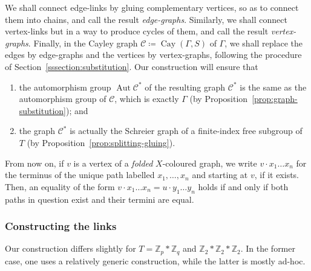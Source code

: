 \documentclass[ALCO,ThmDefs,Unicode,epreuves]{cedram}
\newcommand{\ZZ}{\mathbb{Z}}
\newcommand{\cC}{\mathcal{C}}
\DeclareMathOperator{\Cay}{Cay}
\DeclareMathOperator{\aut}{Aut}
\begin{document}
We shall connect edge-links by gluing complementary vertices, so as to connect them into chains, and call the result \emph{edge-graphs}. Similarly, we shall connect vertex-links but in a way to produce cycles of them, and call the result \emph{vertex-graphs}. Finally, in the Cayley graph $\cC\coloneqq \Cay({\Gamma},S)$ of ${\Gamma}$, we shall replace the edges by edge-graphs and the vertices by vertex-graphs, following the procedure of Section~\ref{sssection:substitution}. Our construction will ensure that
\begin{enumerate}
\item %
the automorphism group $\aut \cC^*$ of the resulting graph $\cC^*$ is the same as the automorphism group of $\cC$, which is exactly ${\Gamma}$ (by Proposition~\ref{prop:graph-substitution}); and 
\item %
the graph $\cC^*$ is actually the Schreier graph of a finite-index free subgroup of $T$ (by Proposition~\ref{prop:splitting-gluing}).
\end{enumerate}
 
From now on, if $v$ is a vertex of a \emph{folded} $X$-coloured graph, we write $v\cdot x_{1} \dots x_n$ for the terminus of the unique path labelled $x_{1}, \dots ,x_n$ and starting at $v$, if it exists. Then, an equality of the form $v\cdot x_{1} \dots x_n = u\cdot y_{1} \dots y_n$ holds if and only if both paths in question exist and their termini are equal. 

\subsubsection{Constructing the links}\label{section:constructionofthelinks}
 
Our construction differs slightly for $T = \ZZ_p*\ZZ_q$ and $\ZZ_2*\ZZ_2*\ZZ_2$. In the former case, one uses a relatively generic construction, while the latter is mostly ad-hoc.

\end{document}
